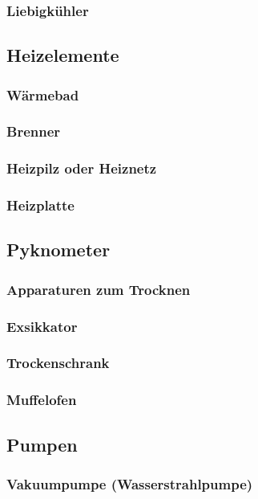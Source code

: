 \subsubsection{Liebigkühler}

\subsection{Heizelemente}
\subsubsection{Wärmebad}
\subsubsection{Brenner}
\subsubsection{Heizpilz oder Heiznetz}
\subsubsection{Heizplatte}

\subsection{Pyknometer}

\subsubsection{Apparaturen zum Trocknen}
\subsubsection{Exsikkator}
\subsubsection{Trockenschrank}
\subsubsection{Muffelofen}

\subsection{Pumpen}
\subsubsection{Vakuumpumpe (Wasserstrahlpumpe)}
